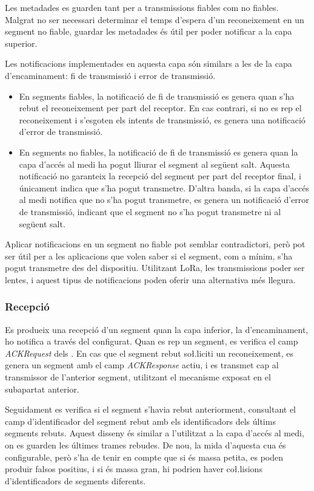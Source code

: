 \documentclass{tfgitic}[2024/07/01]
\begin{document}
{Les metadades es guarden tant per a transmissions fiables com no fiables. Malgrat no ser necessari determinar el temps d'espera d'un reconeixement en un segment no fiable, guardar les metadades és útil per poder notificar a la capa superior.

Les notificacions implementades en aquesta capa són similars a les de la capa d'encaminament: fi de transmissió i error de transmissió.
\begin{itemize}
    \item En segments fiables, la notificació de fi de transmissió es genera quan s'ha rebut el reconeixement per part del receptor. En cas contrari, si no es rep el reconeixement i s'esgoten els intents de transmissió, es genera una notificació d'error de transmissió.
    \item En segments no fiables, la notificació de fi de transmissió es genera quan la capa d'accés al medi ha pogut lliurar el segment al següent salt. Aquesta notificació no garanteix la recepció del segment per part del receptor final, i únicament indica que s'ha pogut transmetre. D'altra banda, si la capa d'accés al medi notifica que no s'ha pogut transmetre, es genera un notificació d'error de transmissió, indicant que el segment no s'ha pogut transmetre ni al següent salt.
\end{itemize}
Aplicar notificacions en un segment no fiable pot semblar contradictori, però pot ser útil per a les aplicacions que volen saber si el segment, com a mínim, s'ha pogut transmetre des del dispositiu. Utilitzant LoRa, les transmissions poder ser lentes, i aquest tipus de notificacions poden oferir una alternativa més llegura.
\subsubsection{Recepció}
Es produeix una recepció d'un segment quan la capa inferior, la d'encaminament, ho notifica a través del  configurat. Quan es rep un segment, es verifica el camp \emph{ACKRequest} dels . En cas que el segment rebut so\l.liciti un reconeixement, es genera un segment amb el camp \emph{ACKResponse} actiu, i es transmet cap al transmissor de l'anterior segment, utilitzant el mecanisme exposat en el subapartat anterior.

Seguidament es verifica si el segment s'havia rebut anteriorment, consultant el camp d'identificador del segment rebut amb els identificadors dels últims segments rebuts. Aquest disseny és similar a l'utilitzat a la capa d'accés al medi, on es guarden les últimes trames rebudes. De nou, la mida d'aquesta cua és configurable, però s'ha de tenir en compte que si és massa petita, es poden produir falsos positius, i si és massa gran, hi podrien haver co\l.lisions d'identificadors de segments diferents.

}
\end{document}

